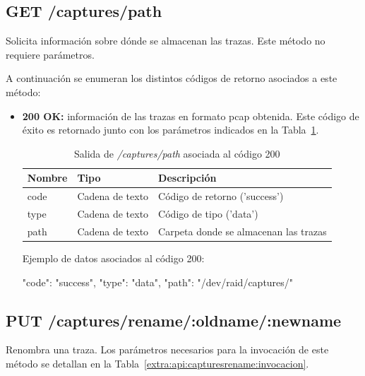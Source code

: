 %
%
\subsection{GET /captures/path}
Solicita información sobre dónde se almacenan las \glspl{traza}.
Este método no requiere parámetros.

A continuación se enumeran los distintos códigos de retorno asociados a este método:
\begin{itemize}

\item{\textbf{200 OK:} información de las \glspl{traza} en formato \gls{pcap} obtenida.
Este código de éxito es retornado junto con los parámetros indicados en la Tabla~\ref{extra:api:capturespath:ok}.
\begin{table}[H]
\centering
\begin{tabular}{|l|l|l|}
\hline
\rowcolor[HTML]{F5F5F5}
\textbf{Nombre}                & \textbf{Tipo}   & \textbf{Descripción}                            \\ \hline
code                           & Cadena de texto & Código de retorno ('success')                   \\ \hline
type                           & Cadena de texto & Código de tipo ('data')                         \\ \hline
path                           & Cadena de texto & Carpeta donde se almacenan las \glspl{traza}    \\ \hline
\end{tabular}
\caption{Salida de \textit{/captures/path} asociada al código 200}
\label{extra:api:capturespath:ok}
\end{table}
\begin{minipage}{\textwidth}
Ejemplo de datos asociados al código 200:

\begin{code}[language=json]
{
  "code": "success",
  "type": "data",
  "path": "/dev/raid/captures/"
}
\end{code}
\end{minipage}
}

\end{itemize}

%
%
\subsection{PUT /captures/rename/:oldname/:newname}
Renombra una \gls{traza}.
Los parámetros necesarios para la invocación de este método se detallan en la Tabla~\ref{extra:api:capturesrename:invocacion}.

